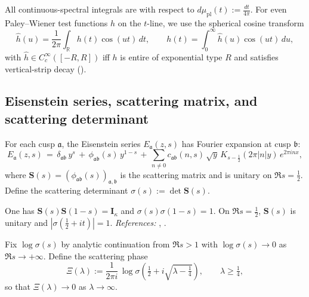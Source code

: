 \begin{definition} %
\label{def:plancherel}
All continuous-spectral integrals are with respect to $d\mu_{\mathrm{pl}}(t):=\frac{dt}{4\pi}$. For even Paley–Wiener test functions $h$ on the $t$-line, we use the spherical cosine transform
\[
  \widehat{h}(u)=\frac{1}{2\pi}\int_{\mathbb{R}} h(t)\cos(ut)\,dt,\qquad
  h(t)=\int_{0}^{\infty} \widehat{h}(u)\cos(ut)\,du,
\]
with $\widehat{h}\in C_c^\infty([-R,R])$ iff $h$ is entire of exponential type $R$ and satisfies vertical-strip decay (\cite[Ch.~3]{Hejhal1983vol2}). \relax
\end{definition}

\subsection{Eisenstein series, scattering matrix, and scattering determinant} %
\label{subsec:ch4-part1-scattering} \relax

\begin{definition} %
\label{def:eisenstein-scattering}
For each cusp $\mathfrak a$, the Eisenstein series $E_{\mathfrak a}(z,s)$ has Fourier expansion at cusp $\mathfrak b$:
\[
E_{\mathfrak a}(z,s) \,=\, \delta_{\mathfrak a\mathfrak b}\,y^{s} \,+\, \phi_{\mathfrak a\mathfrak b}(s)\,y^{1-s} \,+\, \sum_{n\neq 0} c_{\mathfrak a\mathfrak b}(n,s)\,\sqrt{y}\, K_{s-\frac12}(2\pi |n|y)\, e^{2\pi i n x},
\]
where $\mathbf{S}(s)=(\phi_{\mathfrak a\mathfrak b}(s))_{\mathfrak a,\mathfrak b}$ is the scattering matrix and is unitary on $\Re s=\tfrac12$. Define the scattering determinant $\sigma(s):=\det \mathbf{S}(s)$.
\end{definition}

\begin{lemma} %
\label{lem:scattering-FE}
One has $\mathbf{S}(s)\mathbf{S}(1-s)=\mathbf{I}_\kappa$ and $\sigma(s)\sigma(1-s)=1$. On $\Re s=\tfrac12$, $\mathbf{S}(s)$ is unitary and $|\sigma(\tfrac12+it)|=1$. \emph{References:} \cite[Ch.~3–4]{Hejhal1983vol2}, \cite[Ch.~2]{LaxPhillips1976}. \relax
\end{lemma}

\begin{definition}
\label{def:branch-log-sigma}
Fix $\log\sigma(s)$ by analytic continuation from $\Re s>1$ with $\log\sigma(s)\to 0$ as $\Re s\to +\infty$. Define the scattering phase
\[
  \Xi(\lambda):=\frac{1}{2\pi i}\,\log \sigma\!\left(\tfrac12 + i\sqrt{\lambda-\tfrac14}\right),\qquad \lambda\ge \tfrac14,
\]
so that $\Xi(\lambda)\to 0$ as $\lambda\to \infty$. \relax
\end{definition}

